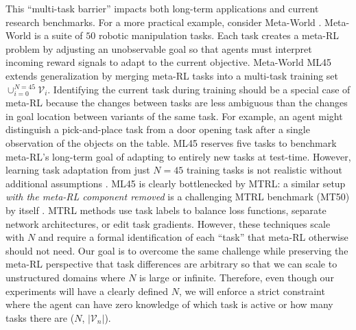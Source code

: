 \documentclass{article}
\begin{document}
This ``multi-task barrier'' impacts both long-term applications and current research benchmarks. For a more practical example, consider Meta-World \cite{yu2020meta}. Meta-World is a suite of $50$ robotic manipulation tasks. Each task creates a meta-RL problem by adjusting an unobservable goal so that agents must interpret incoming reward signals to adapt to the current objective. Meta-World ML45 extends generalization by merging meta-RL tasks into a multi-task training set $\cup_{i=0}^{N=45} \mathcal{V}_i$. Identifying the current task during training should be a special case of meta-RL because the changes between tasks are less ambiguous than the changes in goal location between variants of the same task. For example, an agent might distinguish a pick-and-place task from a door opening task after a single observation of the objects on the table. ML45 reserves five tasks to benchmark meta-RL's long-term goal of adapting to entirely new tasks at test-time. However, learning task adaptation from just $N=45$ training tasks is not realistic without additional assumptions \cite{yu2020meta, anand2022procedural}. ML45 is clearly bottlenecked by MTRL: a similar setup \textit{with the meta-RL component removed} is a challenging MTRL benchmark (MT50) by itself \cite{yu2020gradient, liu2021conflict}. MTRL methods use task labels to balance loss functions, separate network architectures, or edit task gradients. However, these techniques scale with $N$ and require a formal identification of each ``task'' that meta-RL otherwise should not need. Our goal is to overcome the same challenge while preserving the meta-RL perspective that task differences are arbitrary so that we can scale to unstructured domains where $N$ is large \cite{reed2022a} or infinite. Therefore, even though our experiments will have a clearly defined $N$, we will enforce a strict constraint where the agent can have zero knowledge of which task is active or how many tasks there are ($N$, $|\mathcal{V}_n|$).
\vspace{-3mm}
\end{document}
